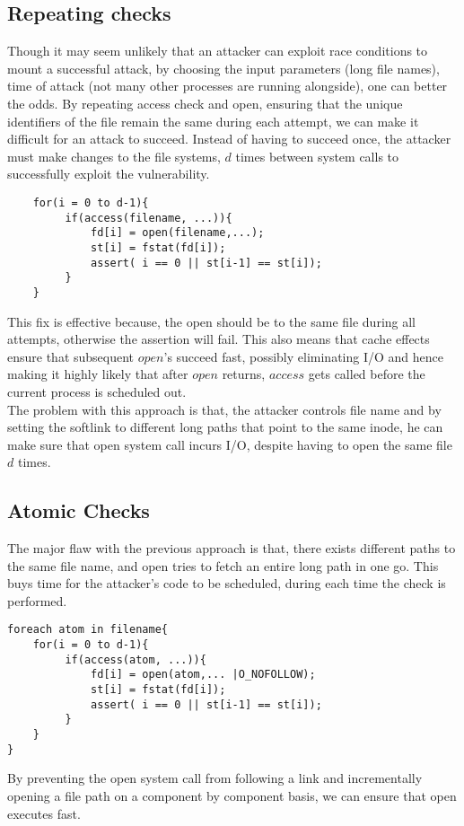 \documentclass[11pt]{article} %
\begin{document}
\subsection {Repeating checks}
Though it may seem unlikely that an attacker can exploit race conditions to
mount a successful attack, by choosing the input parameters (long file names),
time of attack (not many other processes are running alongside), one can better
the odds. By repeating access check and open, ensuring that the unique identifiers
of the file remain the same during each attempt, we can make it difficult for
an attack to succeed. Instead of having to succeed once, the attacker must
make changes to the file systems, $d$ times between system calls to successfully
exploit the vulnerability.
\begin{verbatim}
    for(i = 0 to d-1){
         if(access(filename, ...)){
             fd[i] = open(filename,...);
             st[i] = fstat(fd[i]);
             assert( i == 0 || st[i-1] == st[i]);
         }
    }
\end{verbatim}

This fix is effective because, the open should be to the same file during all
attempts, otherwise the assertion will fail. This also means that cache effects
ensure that subsequent $open$'s succeed fast, possibly eliminating I/O and hence
making it highly likely that after $open$ returns, $access$ gets called before
the current process is scheduled out. \\

The problem with this approach is that, the attacker controls file name and
by setting the softlink to different long paths that point to the same inode,
he can make sure that open system call incurs I/O, despite having to open the
same file $d$ times.

\subsection {Atomic Checks}
The major flaw with the previous approach is that, there exists different paths to
the same file name, and open tries to fetch an entire long path in one go. This
buys time for the attacker's code to be scheduled, during each time the check is
performed.
\begin{verbatim}
foreach atom in filename{
    for(i = 0 to d-1){
         if(access(atom, ...)){
             fd[i] = open(atom,... |O_NOFOLLOW);
             st[i] = fstat(fd[i]);
             assert( i == 0 || st[i-1] == st[i]);
     	 }
    }
}
\end{verbatim}
By preventing the open system call from following a link and incrementally opening
a file path on a component by component basis, we can ensure that open executes
fast. \\
\end{document}

